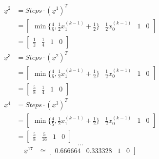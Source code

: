 \begin{align*}
	\underline{x}^2 & = Steps \cdot (\underline{x}^{1})^T                                                               \\
	                & = \begin{bmatrix}
		                    \min \{ \frac{4}{5}, \frac{1}{2} x_1^{(k-1)} + \frac{1}{2} \} & \frac{1}{2} x_0^{(k-1)} & 1 & 0
	                    \end{bmatrix} \\
	                & = \begin{bmatrix}
		                    \frac{1}{2} & \frac{1}{4} & 1 & 0
	                    \end{bmatrix}
\end{align*}
\begin{align*}
	\underline{x}^3 & = Steps \cdot (\underline{x}^{2})^T                                                               \\
	                & = \begin{bmatrix}
		                    \min \{ \frac{4}{5}, \frac{1}{2} x_1^{(k-1)} + \frac{1}{2} \} & \frac{1}{2} x_0^{(k-1)} & 1 & 0
	                    \end{bmatrix} \\
	                & = \begin{bmatrix}
		                    \frac{5}{8} & \frac{1}{4} & 1 & 0
	                    \end{bmatrix}
\end{align*}
\begin{align*}
	\underline{x}^4 & = Steps \cdot (\underline{x}^{3})^T                                                               \\
	                & = \begin{bmatrix}
		                    \min \{ \frac{4}{5}, \frac{1}{2} x_1^{(k-1)} + \frac{1}{2} \} & \frac{1}{2} x_0^{(k-1)} & 1 & 0
	                    \end{bmatrix} \\
	                & = \begin{bmatrix}
		                    \frac{5}{8} & \frac{5}{16} & 1 & 0
	                    \end{bmatrix}
\end{align*}
\[
	\dots
\]
\begin{align*}
	\underline{x}^{17} & \simeq \begin{bmatrix}
		                            0.666664 & 0.333328 & 1 & 0
	                            \end{bmatrix}
\end{align*}

